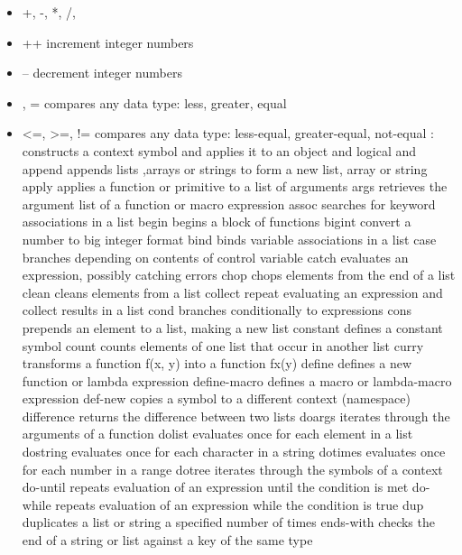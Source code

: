 \documentclass[cn,11pt]{elegantbook}
\begin{document}
\begin{itemize}
  \item +, -, *, /, %
  \item ++                increment integer numbers
 \item --                decrement integer numbers
 \item <, >, =           compares any data type: less, greater, equal
  \item <=, >=, !=        compares any data type: less-equal, greater-equal, not-equal
:                 constructs a context symbol and applies it to an object
and               logical and
append            appends lists ,arrays or strings to form a new list, array or string
apply             applies a function or primitive to a list of arguments
args              retrieves the argument list of a function or macro expression
assoc             searches for keyword associations in a list
begin             begins a block of functions
bigint            convert a number to big integer format
bind              binds variable associations in a list
case              branches depending on contents of control variable
catch             evaluates an expression, possibly catching errors
chop              chops elements from the end of a list
clean             cleans elements from a list
collect           repeat evaluating an expression and collect results in a list
cond              branches conditionally to expressions
cons              prepends an element to a list, making a new list
constant          defines a constant symbol
count             counts elements of one list that occur in another list
curry             transforms a function f(x, y) into a function fx(y)
define            defines a new function or lambda expression
define-macro      defines a macro or lambda-macro expression
def-new           copies a symbol to a different context (namespace)
difference        returns the difference between two lists
doargs            iterates through the arguments of a function
dolist            evaluates once for each element in a list
dostring          evaluates once for each character in a string
dotimes           evaluates once for each number in a range
dotree            iterates through the symbols of a context
do-until          repeats evaluation of an expression until the condition is met
do-while          repeats evaluation of an expression while the condition is true
dup               duplicates a list or string a specified number of times
ends-with         checks the end of a string or list against a key of the same type

\end{itemize}
\end{document}
